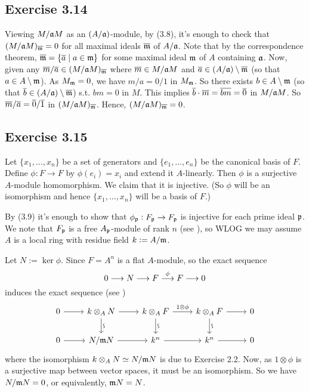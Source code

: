 \documentclass[../A&M.tex]{subfiles}
\begin{document}
\subsection*{Exercise 3.14}

Viewing $M/\mathfrak{a} M$ as an $(A/\mathfrak{a})$-module, by (3.8), it's enough to check that $(M/\mathfrak{a} M)_{\overline{\mathfrak{m}}} = 0$ for all maximal ideals $\overline{\mathfrak{m}}$ of $A/\mathfrak{a}$. Note that by the correspondence theorem, $\overline{\mathfrak{m}} = \{\overline{a} \mid a\in\mathfrak{m}\}$ for some maximal ideal $\mathfrak{m}$ of $A$ containing $\mathfrak{a}$. Now, given any $\overline{m}/\overline{a} \in (M/\mathfrak{a} M)_{\overline{\mathfrak{m}}}$ where $\overline{m} \in M/\mathfrak{a} M$ and $\overline{a} \in (A/\mathfrak{a}) \setminus \overline{\mathfrak{m}}$ (so that $a \in A \setminus \mathfrak{m}$). As $M_{\mathfrak{m}}=0$, we have $m/a = 0/1$ in $M_{\mathfrak{m}}$. So there exists $b\in A\setminus \mathfrak{m}$ (so that $\overline{b} \in (A/\mathfrak{a}) \setminus\overline{\mathfrak{m}}$) s.t. $bm=0$ in $M$. This implies $\overline{b}\cdot\overline{m} = \overline{bm} = \overline{0}$ in $M/\mathfrak{a} M$. So $\overline{m}/\overline{a} = \overline{0}/\overline{1}$ in $(M/\mathfrak{a} M)_{\overline{\mathfrak{m}}}$. Hence, $(M/\mathfrak{a} M)_{\overline{\mathfrak{m}}}=0$.

\subsection*{Exercise 3.15}

Let $\{x_1,\ldots,x_n\}$ be a set of generators and $\{e_1,\ldots,e_n\}$ be the canonical basis of $F$. Define $\phi: F\to F$ by $\phi(e_i) = x_i$ and extend it $A$-linearly. Then $\phi$ is a surjective $A$-module homomorphism. We claim that it is injective. (So $\phi$ will be an isomorphism and hence $\{x_1,\ldots,x_n\}$ will be a basis of $F$.)

By (3.9) it's enough to show that $\phi_{\mathfrak{p}}: F_{\mathfrak{p}} \to F_{\mathfrak{p}}$ is injective for each prime ideal $\mathfrak{p}$. We note that $F_{\mathfrak{p}}$ is a free $A_{\mathfrak{p}}$-module of rank $n$ (see ), so WLOG we may assume $A$ is a local ring with residue field $k:=A/\mathfrak{m}$.

Let $N:=\ker \phi$. Since $F=A^n$ is a flat $A$-module, so the exact sequence
$$
0 \longrightarrow N \longrightarrow F \overset{\phi}{\longrightarrow} F \longrightarrow 0
$$
induces the exact sequence (see )
$$
\begin{tikzcd}
0 \arrow{r} & k \otimes_A N \arrow{r} \visoarrow{d} & k \otimes_A F \arrow[r, "1 \otimes \phi"] \visoarrow{d} & k \otimes_A F \arrow{r} \visoarrow{d} & 0 \\ 
0 \arrow{r} & N/\mfk N \arrow{r} & k^n \arrow{r} & k^n \arrow[r] & 0
\end{tikzcd}
$$
where the isomorphism $k \otimes_A N \simeq N/\mathfrak{m} N$ is due to Exercise 2.2. Now, as $1 \otimes \phi$ is a surjective map between vector spaces, it must be an isomorphism. So we have $N/\mathfrak{m} N = 0$, or equivalently, $\mathfrak{m} N=N$.
\end{document}
